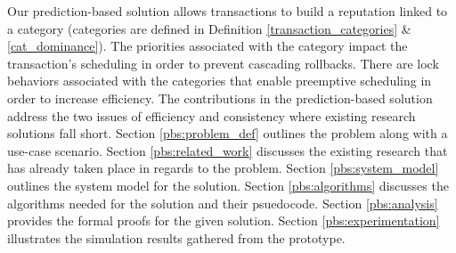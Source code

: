 Our prediction-based solution allows transactions to build a reputation linked to a category (categories are defined in Definition \ref{transaction_categories} \& \ref{cat_dominance}). The priorities associated with the category impact the transaction's scheduling in order to prevent cascading rollbacks. There are lock behaviors associated with the categories that enable preemptive scheduling in order to increase efficiency. The contributions in the prediction-based solution address the two issues of efficiency and consistency where existing research solutions fall short. Section \ref{pbs:problem_def} outlines the problem along with a use-case scenario. Section \ref{pbs:related_work} discusses the existing research that has already taken place in regards to the problem. Section \ref{pbs:system_model} outlines the system model for the solution. Section \ref{pbs:algorithms} discusses the algorithms needed for the solution and their psuedocode. Section \ref{pbs:analysis} provides the formal proofs for the given solution. Section \ref{pbs:experimentation} illustrates the simulation results gathered from the prototype.